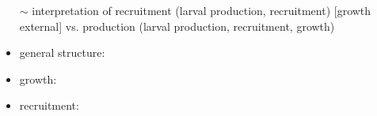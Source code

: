 
%

%
\begin{itemize}
	\item[$\sim$] interpretation of recruitment (larval production, recruitment) [growth external] vs. production (larval production, recruitment, growth)
\end{itemize}




\begin{itemize}
\item general structure:   
\item growth: 
\item recruitment: 
\end{itemize}

%

